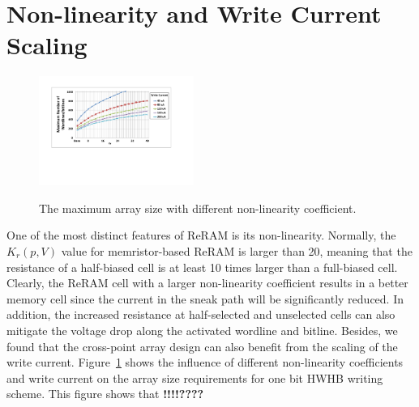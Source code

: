 \section{Non-linearity and Write Current Scaling}\label{sec:scale}
\begin{figure}[!b]
\centering
  \includegraphics[width=0.45\textwidth]{./figures/non_linear_f}\\
  \caption{The maximum array size with different non-linearity coefficient.}\label{fig:non_linear}
\end{figure}
One of the most distinct features of ReRAM is its non-linearity. Normally,
the $K_r(p,V)$ value for memristor-based ReRAM is larger than 20, meaning
that the resistance of a half-biased cell is at least 10 times larger than
a full-biased cell. Clearly, the ReRAM cell with a larger non-linearity
coefficient results in a better memory cell since the current in the sneak
path will be significantly reduced. In addition, the increased resistance
at half-selected and unselected cells can also mitigate the voltage drop
along the activated wordline and bitline. Besides, we found that the
cross-point array design can also benefit from the scaling of the write
current. Figure~\ref{fig:non_linear} shows the influence of different
non-linearity coefficients and write current on the array size
requirements for one bit HWHB writing scheme. This figure shows that
\textbf{!!!!????}


